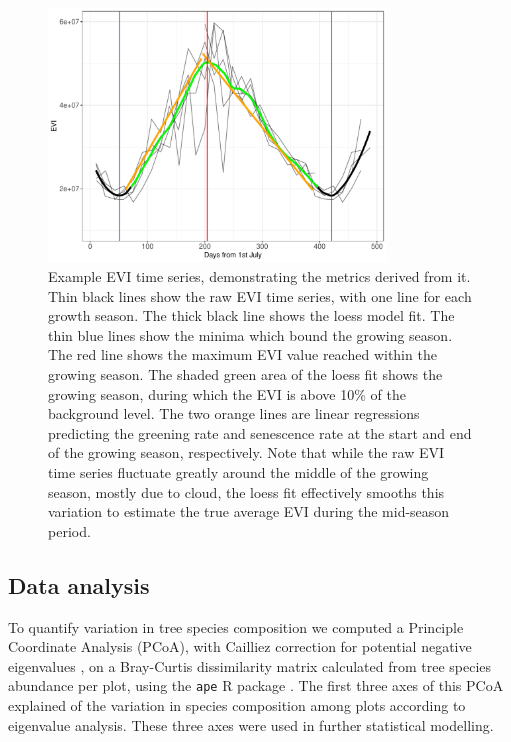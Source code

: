 \documentclass[11pt,a4paper]{article}
\begin{document}
\begin{figure}[H]
\centering
	\includegraphics[width=0.8\textwidth]{ts_example}
	\caption{Example EVI time series, demonstrating the metrics derived from it. Thin black lines show the raw EVI time series, with one line for each growth season. The thick black line shows the loess model fit. The thin blue lines show the minima which bound the growing season. The red line shows the maximum EVI value reached within the growing season. The shaded green area of the loess fit shows the growing season, during which the EVI is above 10\% of the background level. The two orange lines are linear regressions predicting the greening rate and senescence rate at the start and end of the growing season, respectively. Note that while the raw EVI time series fluctuate greatly around the middle of the growing season, mostly due to cloud, the loess fit effectively smooths this variation to estimate the true average EVI during the mid-season period.}
	\label{ts_example}
\end{figure}


\subsection{Data analysis}

To quantify variation in tree species composition we computed a Principle Coordinate Analysis (PCoA), with Cailliez correction for potential negative eigenvalues \citep{Legendre1998}, on a Bray-Curtis dissimilarity matrix calculated from tree species abundance per plot, using the \texttt{ape} R package \citep{ape2019}. The first three axes of this PCoA explained \pcoaPer{} of the variation in species composition among plots according to eigenvalue analysis. These three axes were used in further statistical modelling.
\end{document}
